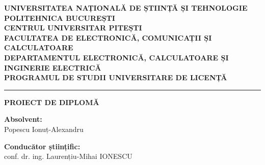 \documentclass[titlepage,12pt]{article}
\begin{document}
\begin{titlepage}
    \thispagestyle{empty}
    {\arialfont %
    \begin{flushleft}
        \textbf{UNIVERSITATEA NAȚIONALĂ DE ȘTIINȚĂ ȘI TEHNOLOGIE POLITEHNICA BUCUREȘTI}\\[0.1cm]
        \textbf{CENTRUL UNIVERSITAR PITEȘTI}\\[0.1cm]
        \textbf{FACULTATEA DE ELECTRONICĂ, COMUNICAȚII ȘI CALCULATOARE}\\[0.1cm]
        \textbf{DEPARTAMENTUL ELECTRONICĂ, CALCULATOARE ȘI INGINERIE ELECTRICĂ}\\[0.1cm]
        \textbf{PROGRAMUL DE STUDII UNIVERSITARE DE LICENȚĂ}\\[0.3cm]
        \hrule
    \end{flushleft}


        \vspace{6cm}
    \begin{center}
        {\Huge \textbf{PROIECT DE DIPLOMĂ}}\\[6cm]

        \noindent
        \begin{minipage}{0.45\textwidth}
            \textbf{Absolvent:}\\
            Popescu Ionuț-Alexandru
        \end{minipage}
        \hfill
        \begin{minipage}{0.45\textwidth}
            \vspace{1cm}
            \raggedleft
            \textbf{Conducător științific:}\\
            conf. dr. ing. Laurențiu-Mihai IONESCU
        \end{minipage}

        \vspace{2cm}
    \end{center}
    }
\end{titlepage}
\newpage
\end{document}
